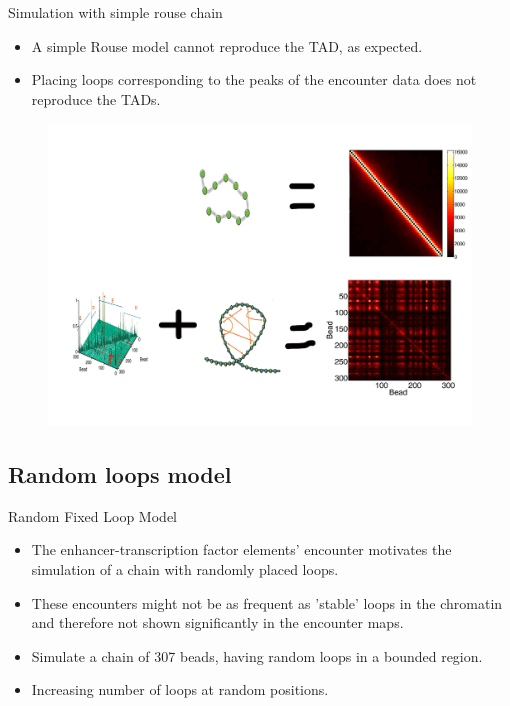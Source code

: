 \documentclass[8pt]{beamer}
\begin{document}
\begin{frame}{Simulation with simple rouse chain}
\begin{itemize}
\item A simple Rouse model cannot reproduce the TAD, as expected.
\item Placing loops corresponding to the peaks of the encounter data does not reproduce the TADs. 
\end{itemize}
\begin{figure}[H]
\includegraphics[scale=0.4]{simulationWithSimpleRouseExperimentalData}
\end{figure}
\end{frame}

\subsection{Random loops model}\label{subsection_randomLoopsModel}

\begin{frame}{Random Fixed Loop Model}
\begin{itemize}
\item The enhancer-transcription factor elements' encounter motivates the simulation of a chain with randomly placed loops.
\item These encounters might not be as frequent as 'stable' loops in the chromatin and therefore not shown significantly in the encounter maps.
\item Simulate a chain of 307 beads, having random loops in a bounded region.
\item Increasing number of loops at random positions. 
\end{itemize}

\end{frame}
\end{document}
